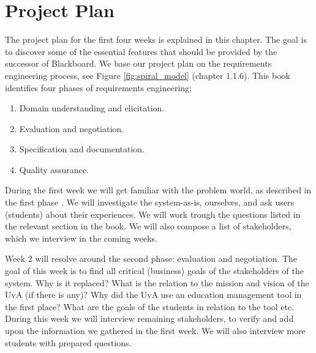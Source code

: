

\chapter{Project Plan}
The project plan for the first four weeks is explained in this chapter. The goal is to discover some of the essential features that should be provided by the successor of Blackboard. We base our project plan on the requirements engineering process, see Figure \ref{fig:spiral_model} \cite{RE_book} (chapter 1.1.6). This book identifies four phases of requirements engineering; 

\begin{enumerate}
	\item Domain understanding and elicitation.
	\item Evaluation and negotiation.
	\item Specification and documentation.
	\item Quality assurance.
\end{enumerate}

During the first week we will get familiar with the problem world, as described in the first phase \cite{RE_book}. We will investigate the system-as-is, ourselves, and ask users (students) about their experiences. We will work trough the questions listed in the relevant section in the book. We will also compose a list of stakeholders, which we interview in the coming weeks.

Week 2 will resolve around the second phase: evaluation and negotiation. The goal of this week is to find all critical (business) goals of the stakeholders of the system. Why is it replaced? What is the relation to the mission and vision of the UvA (if there is any)? Why did the UvA use an education management tool in the first place? What are the goals of the students in relation to the tool etc. During this week we will interview remaining stakeholders, to verify and add upon the information we gathered in the first week. We will also interview more students with prepared questions.

